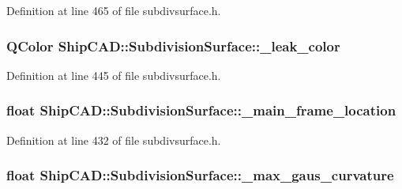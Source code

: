 Definition at line 465 of file subdivsurface.\+h.

\subsubsection[{\texorpdfstring{\+\_\+leak\+\_\+color}{_leak_color}}]{\setlength{\rightskip}{0pt plus 5cm}Q\+Color Ship\+C\+A\+D\+::\+Subdivision\+Surface\+::\+\_\+leak\+\_\+color\hspace{0.3cm}{\ttfamily [protected]}}\hypertarget{classShipCAD_1_1SubdivisionSurface_aacd1616b97a4425cc9b1051e01785596}{}\label{classShipCAD_1_1SubdivisionSurface_aacd1616b97a4425cc9b1051e01785596}


Definition at line 445 of file subdivsurface.\+h.

\subsubsection[{\texorpdfstring{\+\_\+main\+\_\+frame\+\_\+location}{_main_frame_location}}]{\setlength{\rightskip}{0pt plus 5cm}float Ship\+C\+A\+D\+::\+Subdivision\+Surface\+::\+\_\+main\+\_\+frame\+\_\+location\hspace{0.3cm}{\ttfamily [protected]}}\hypertarget{classShipCAD_1_1SubdivisionSurface_a3ea08aa45ad221a1b485010ce5e8dee7}{}\label{classShipCAD_1_1SubdivisionSurface_a3ea08aa45ad221a1b485010ce5e8dee7}


Definition at line 432 of file subdivsurface.\+h.

\subsubsection[{\texorpdfstring{\+\_\+max\+\_\+gaus\+\_\+curvature}{_max_gaus_curvature}}]{\setlength{\rightskip}{0pt plus 5cm}float Ship\+C\+A\+D\+::\+Subdivision\+Surface\+::\+\_\+max\+\_\+gaus\+\_\+curvature\hspace{0.3cm}{\ttfamily [protected]}}\hypertarget{classShipCAD_1_1SubdivisionSurface_a1658374385131656d359ff373d2cb08c}{}\label{classShipCAD_1_1SubdivisionSurface_a1658374385131656d359ff373d2cb08c}


